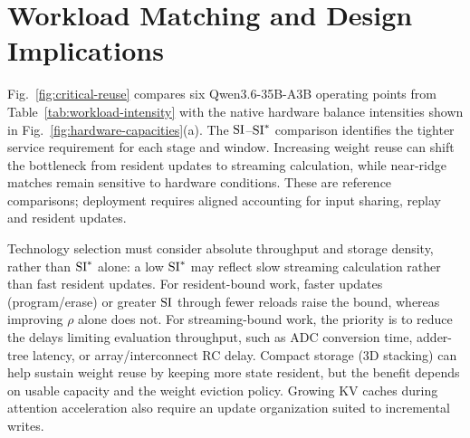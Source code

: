 \section{Workload Matching and Design Implications}
\label{sec:implications}

Fig.~\ref{fig:critical-reuse} compares six Qwen3.6-35B-A3B operating points from Table~\ref{tab:workload-intensity} with the native hardware balance intensities shown in Fig.~\ref{fig:hardware-capacities}(a). The $\mathrm{SI}$--$\mathrm{SI}^*$ comparison identifies the tighter service requirement for each stage and window. Increasing weight reuse can shift the bottleneck from resident updates to streaming calculation, while near-ridge matches remain sensitive to hardware conditions. These are reference comparisons; deployment requires aligned accounting for input sharing, replay and resident updates.



Technology selection must consider absolute throughput and storage density, rather than $\mathrm{SI}^*$ alone: a low $\mathrm{SI}^*$ may reflect slow streaming calculation rather than fast resident updates. For resident-bound work, faster updates (program/erase) or greater $\mathrm{SI}$ through fewer reloads raise the bound, whereas improving $\rho$ alone does not. For streaming-bound work, the priority is to reduce the delays limiting evaluation throughput, such as ADC conversion time, adder-tree latency, or array/interconnect RC delay. Compact storage (3D stacking) can help sustain weight reuse by keeping more state resident, but the benefit depends on usable capacity and the weight eviction policy. Growing KV caches during attention acceleration also require an update organization suited to incremental writes.
